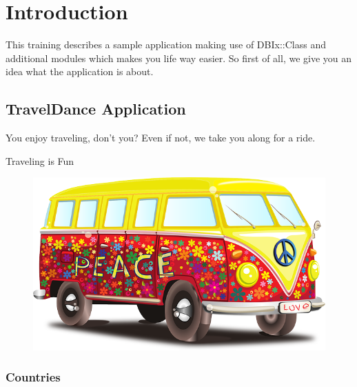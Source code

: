 
\maketitle

\begin{frame}
  \titlepage
\end{frame}

\cleardoublepage

\tableofcontents

\cleardoublepage

\section{Introduction}

This training describes a sample application making use of
DBIx::Class and additional modules which makes you life
way easier. So first of all, we give you an idea what
the application is about.

\subsection{TravelDance Application}

You enjoy traveling, don't you? Even if not, we take you
along for a ride.

\begin{frame}{Traveling is Fun}
\begin{figure}[!ht]
\centering
\includegraphics[width=1\linewidth]{img/volkswagen.png}
\end{figure}
\end{frame}

\subsubsection{Countries}

